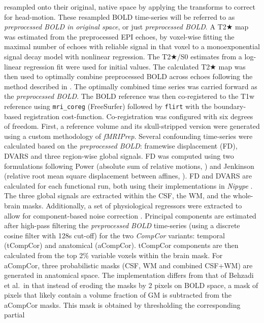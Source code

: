 \documentclass[
]{article}
\begin{document}
\begin{description}
resampled onto their original, native space by applying the transforms
to correct for head-motion. These resampled BOLD time-series will be
referred to as \emph{preprocessed BOLD in original space}, or just
\emph{preprocessed BOLD}. A T2★ map was estimated from the preprocessed
EPI echoes, by voxel-wise fitting the maximal number of echoes with
reliable signal in that voxel to a monoexponential signal decay model
with nonlinear regression. The T2★/S0 estimates from a log-linear
regression fit were used for initial values. The calculated T2★ map was
then used to optimally combine preprocessed BOLD across echoes following
the method described in \citep{posse_t2s}. The optimally combined time
series was carried forward as the \emph{preprocessed BOLD}. The BOLD
reference was then co-registered to the T1w reference using
\texttt{mri\_coreg} (FreeSurfer) followed by \texttt{flirt} \citep[FSL
6.0.5.1:57b01774,][]{flirt} with the boundary-based registration
\citep{bbr} cost-function. Co-registration was configured with six
degrees of freedom. First, a reference volume and its skull-stripped
version were generated using a custom methodology of \emph{fMRIPrep}.
Several confounding time-series were calculated based on the
\emph{preprocessed BOLD}: framewise displacement (FD), DVARS and three
region-wise global signals. FD was computed using two formulations
following Power (absolute sum of relative motions,
\citet{power_fd_dvars}) and Jenkinson (relative root mean square
displacement between affines, \citet{mcflirt}). FD and DVARS are
calculated for each functional run, both using their implementations in
\emph{Nipype} \citep[following the definitions by][]{power_fd_dvars}.
The three global signals are extracted within the CSF, the WM, and the
whole-brain masks. Additionally, a set of physiological regressors were
extracted to allow for component-based noise correction
\citep[\emph{CompCor},][]{compcor}. Principal components are estimated
after high-pass filtering the \emph{preprocessed BOLD} time-series
(using a discrete cosine filter with 128s cut-off) for the two
\emph{CompCor} variants: temporal (tCompCor) and anatomical (aCompCor).
tCompCor components are then calculated from the top 2\% variable voxels
within the brain mask. For aCompCor, three probabilistic masks (CSF, WM
and combined CSF+WM) are generated in anatomical space. The
implementation differs from that of Behzadi et al.~in that instead of
eroding the masks by 2 pixels on BOLD space, a mask of pixels that
likely contain a volume fraction of GM is subtracted from the aCompCor
masks. This mask is obtained by thresholding the corresponding partial

\end{description}
\end{document}
